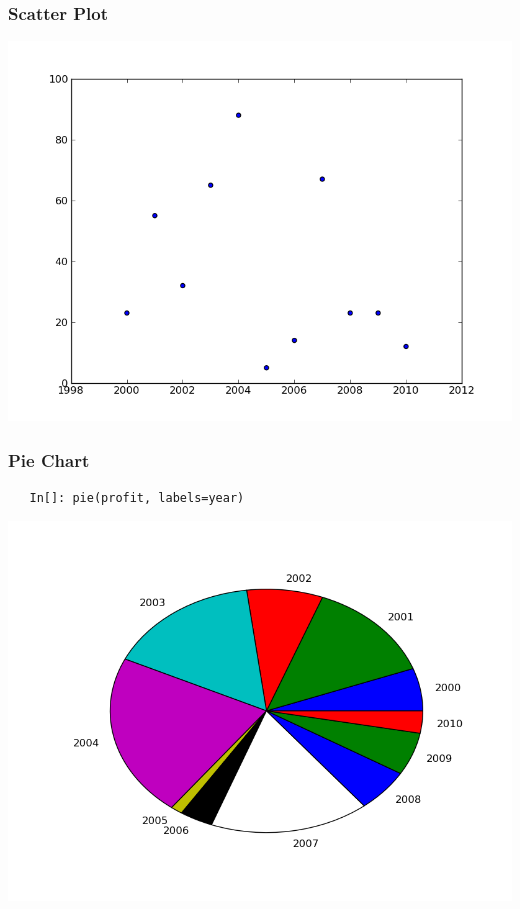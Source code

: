 \begin{frame}
\frametitle{Scatter Plot}
\includegraphics[scale=0.45]{../advanced_python/images/scatter.png}\\
\end{frame}

\begin{frame}[fragile]
  \frametitle{Pie Chart}
  \begin{lstlisting}
   In[]: pie(profit, labels=year)
  \end{lstlisting}
\includegraphics[scale=0.35]{../advanced_python/images/pie.png}\\
\end{frame}

